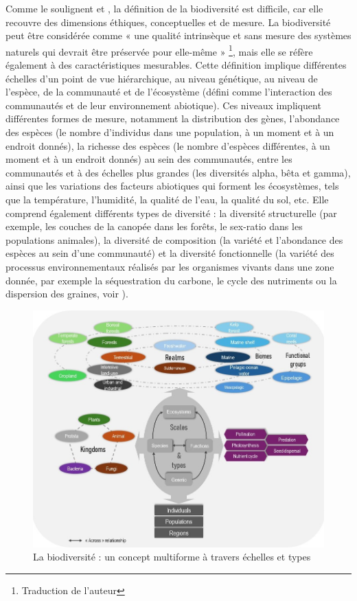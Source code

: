Comme le soulignent \cite{VanDyke2008} et \cite{mouysset_diversity_2023}, la définition de la biodiversité est difficile, car elle recouvre des dimensions éthiques, conceptuelles et de mesure. La biodiversité peut être considérée comme « une qualité intrinsèque et sans mesure des systèmes naturels qui devrait être préservée pour elle-même » \citep{VanDyke2008, mouysset_diversity_2023}\footnote{Traduction de l'auteur}, mais elle se réfère également à des caractéristiques mesurables.
%
Cette définition implique différentes échelles d'un point de vue hiérarchique, au niveau génétique, au niveau de l'espèce, de la communauté et de l'écosystème (défini comme l'interaction des communautés et de leur environnement abiotique). Ces niveaux impliquent différentes formes de mesure, notamment la distribution des gènes, l'abondance des espèces (le nombre d'individus dans une population, à un moment et à un endroit donnés), la richesse des espèces (le nombre d'espèces différentes, à un moment et à un endroit donnés) au sein des communautés, entre les communautés et à des échelles plus grandes (les diversités alpha, bêta et gamma), ainsi que les variations des facteurs abiotiques qui forment les écosystèmes, tels que la température, l'humidité, la qualité de l'eau, la qualité du sol, etc. 
Elle comprend également différents types de diversité : la diversité structurelle (par exemple, les couches de la canopée dans les forêts, le sex-ratio dans les populations animales), la diversité de composition (la variété et l'abondance des espèces au sein d'une communauté) et la diversité fonctionnelle (la variété des processus environnementaux réalisés par les organismes vivants dans une zone donnée, par exemple la séquestration du carbone, le cycle des nutriments ou la dispersion des graines, voir \cite{loreau_biodiversity_2002}).

\begin{figure}[h]
	\centering
	\includegraphics[width =.8\textwidth]{figures/intro/biodiv_illustration.jpg}
	\caption{ La biodiversité : un concept multiforme à travers échelles et types}
	\label{fig:intro_biod_french}
\end{figure}

